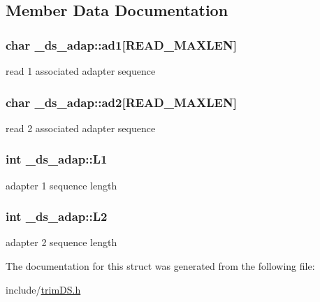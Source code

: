 \subsection{Member Data Documentation}
\hypertarget{struct__ds__adap_ae14dd70536b6c7e795261cafad1c2d72}{
\subsubsection[{ad1}]{\setlength{\rightskip}{0pt plus 5cm}char \+\_\+ds\+\_\+adap\+::ad1\mbox{[}R\+E\+A\+D\+\_\+\+M\+A\+X\+L\+E\+N\mbox{]}}}\label{struct__ds__adap_ae14dd70536b6c7e795261cafad1c2d72}
read 1 associated adapter sequence \hypertarget{struct__ds__adap_a6206cafdf0cfea58ce84c08515def558}{
\subsubsection[{ad2}]{\setlength{\rightskip}{0pt plus 5cm}char \+\_\+ds\+\_\+adap\+::ad2\mbox{[}R\+E\+A\+D\+\_\+\+M\+A\+X\+L\+E\+N\mbox{]}}}\label{struct__ds__adap_a6206cafdf0cfea58ce84c08515def558}
read 2 associated adapter sequence \hypertarget{struct__ds__adap_a57266ed9fb1b73a20f98b8df2235f0c8}{
\subsubsection[{L1}]{\setlength{\rightskip}{0pt plus 5cm}int \+\_\+ds\+\_\+adap\+::\+L1}}\label{struct__ds__adap_a57266ed9fb1b73a20f98b8df2235f0c8}
adapter 1 sequence length \hypertarget{struct__ds__adap_a80926b243dd1120a43bd9b8e00774b99}{
\subsubsection[{L2}]{\setlength{\rightskip}{0pt plus 5cm}int \+\_\+ds\+\_\+adap\+::\+L2}}\label{struct__ds__adap_a80926b243dd1120a43bd9b8e00774b99}
adapter 2 sequence length 

The documentation for this struct was generated from the following file\+:\begin{DoxyCompactItemize}
\item 
include/\hyperlink{trimDS_8h}{trim\+D\+S.\+h}\end{DoxyCompactItemize}
